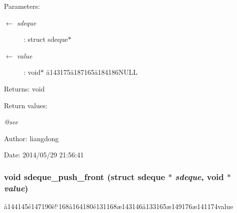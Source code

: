 \begin{Desc}
\item[Parameters:]
\begin{description}
\item[\mbox{$\leftarrow$} {\em sdeque}]: struct sdeque$\ast$ \item[\mbox{$\leftarrow$} {\em value}]: void$\ast$ \aa{}143175\"{a}187165\"{a}184186NULL \end{description}
\end{Desc}
\begin{Desc}
\item[Returns:]void \end{Desc}
\begin{Desc}
\item[Return values:]
\begin{description}
\item[{\em @see}]\end{description}
\end{Desc}
\begin{Desc}
\item[Author:]liangdong \end{Desc}
\begin{Desc}
\item[Date:]2014/05/29 21:56:41 \end{Desc}
\subsubsection{\setlength{\rightskip}{0pt plus 5cm}void sdeque\_\-push\_\-front (struct sdeque $\ast$ {\em sdeque}, void $\ast$ {\em value})}\label{sdeque_8h_a2}


\aa{}144145\'{e}147190\`{e}!`168\aa{}164180\'{e}131168\ae{}143146\aa{}133165\ae{}149176\ae{}141174value 

